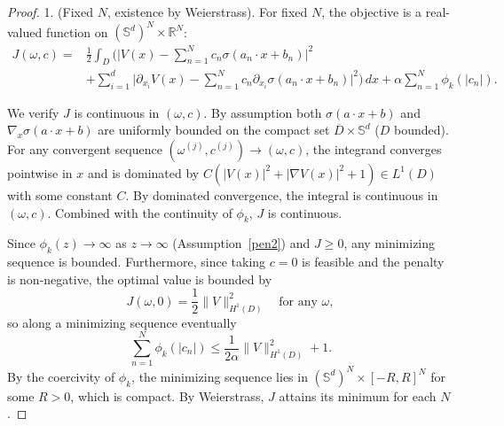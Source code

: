 \documentclass[11pt]{amsart}
\theoremstyle{definition}
\theoremstyle{remark}
\begin{document}
\begin{proof}
1. (Fixed $N$, existence by Weierstrass).
For fixed $N$, the objective is a real-valued function on $(\mathbb{S}^d)^N \times \mathbb{R}^N$:
\begin{equation*}
\begin{aligned}
	J(\omega, c) ={}& \frac{1}{2} \int_D \bigg( \bigg| V(x) - \sum_{n=1}^N c_n \sigma(a_n \cdot x + b_n) \bigg|^2 \\
	&+ \sum_{i=1}^d \bigg| \partial_{x_i} V(x) - \sum_{n=1}^N c_n \partial_{x_i} \sigma(a_n \cdot x + b_n) \bigg|^2 \bigg)\, dx + \alpha \sum_{n=1}^N \phi_k(|c_n|).
\end{aligned}
\end{equation*}

We verify $J$ is continuous in $(\omega, c)$.
By assumption both $\sigma(a \cdot x + b)$ and $\nabla_x \sigma(a \cdot x + b)$ are uniformly bounded on the compact set $\overline{D} \times \mathbb{S}^d$ ($D$ bounded).
For any convergent sequence $(\omega^{(j)}, c^{(j)}) \to (\omega, c)$, the integrand converges pointwise in $x$ and is dominated by $C(|V(x)|^2 + |\nabla V(x)|^2 + 1) \in L^1(D)$ with some constant $C$.
By dominated convergence, the integral is continuous in $(\omega, c)$. Combined with the continuity of $\phi_k$, $J$ is continuous.

Since $\phi_k(z) \to \infty$ as $z \to \infty$ (Assumption~\ref{pen2}) and $J \ge 0$, any minimizing sequence is bounded.
Furthermore, since taking $c = 0$ is feasible and the penalty is non-negative, the optimal value is bounded by
\begin{equation*}
	J(\omega, 0) = \frac{1}{2}\|V\|_{H^1(D)}^2 \quad \text{for any } \omega,
\end{equation*}
so along a minimizing sequence eventually
\begin{equation*}
	\sum_{n = 1}^N \phi_k(|c_n|) \le \frac{1}{2\alpha}\|V\|_{H^1(D)}^2 + 1.
\end{equation*}
By the coercivity of $\phi_k$, the minimizing sequence lies in $(\mathbb{S}^d)^N \times [-R, R]^N$ for some $R > 0$, which is compact. By Weierstrass, $J$ attains its minimum for each $N$.


\end{proof}
\end{document}
